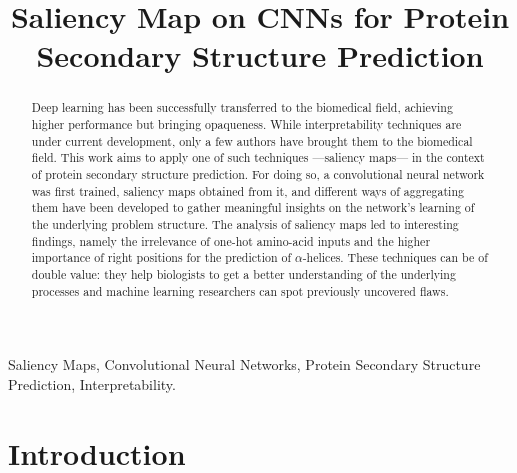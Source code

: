 \documentclass{article}
\title{Saliency Map on CNNs for Protein Secondary Structure	Prediction}
\begin{document}
%
\maketitle
%
\begin{abstract}

Deep learning has been successfully transferred to the biomedical field, achieving higher performance but bringing opaqueness. While interpretability techniques are under current development, only a few authors have brought them to the biomedical field. This work aims to apply one of such techniques ---saliency maps--- in the context of protein secondary structure prediction. For doing so, a convolutional neural network was first trained, saliency maps obtained from it, and different ways of aggregating them have been developed to gather meaningful insights on the network's learning of the underlying problem structure. The analysis of saliency maps led to interesting findings, namely the irrelevance of one-hot amino-acid inputs and the higher importance of right positions for the prediction of $\alpha$-helices. These techniques can be of double value: they help biologists to get a better understanding of the underlying processes and machine learning researchers can spot previously uncovered flaws.
\end{abstract}
%
\begin{keywords}
Saliency Maps, Convolutional Neural Networks, Protein Secondary Structure Prediction, Interpretability.
\end{keywords}
%
\section{Introduction}
\label{sec:intro}


\end{document}
